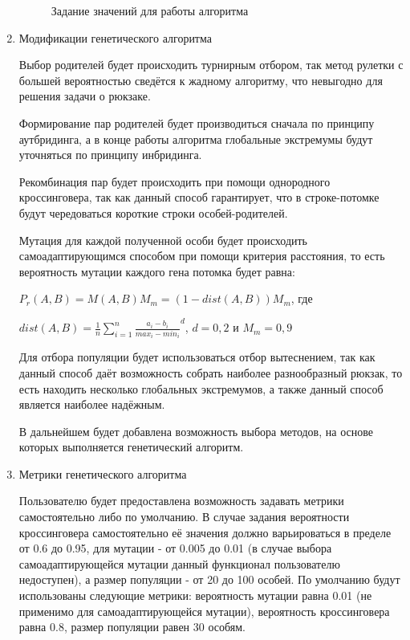 \documentclass{article}
\begin{document}
\begin{enumerate}
\begin{figure}[h!]
\begin{minipage}[h]{0.32\linewidth}
\end{minipage}
\caption{Задание значений для работы алгоритма}
\label{ris:image1}
\end{figure}

\newpage

\item Модификации генетического алгоритма

Выбор родителей будет происходить турнирным отбором, так метод рулетки с большей вероятностью сведётся к жадному алгоритму, что невыгодно для решения задачи о рюкзаке.

Формирование пар родителей будет производиться сначала по принципу аутбридинга, а в конце работы алгоритма глобальные экстремумы будут уточняться по принципу инбридинга. 

Рекомбинация пар будет происходить при помощи однородного кроссинговера, так как данный способ гарантирует, что в строке-потомке будут чередоваться короткие строки особей-родителей. 

Мутация для каждой полученной особи будет происходить самоадаптирующимся способом при помощи критерия расстояния, то есть вероятность мутации каждого гена потомка будет равна: 

{
\Large
\begin{center}
$P_r(A,B) = M(A,B)M_m = (1 - dist(A,B))M_m$, где

$dist(A,B) = \frac{1}{n}\sum_{i=1}^n\frac{a_i-b_i}{max_i-min_i}^d$, $d=0,2$ и $M_m=0,9$
\end{center}
}

Для отбора популяции будет использоваться отбор вытеснением, так как данный способ даёт возможность собрать наиболее разнообразный рюкзак, то есть находить несколько глобальных экстремумов, а также данный способ является наиболее надёжным.

В дальнейшем будет добавлена возможность выбора методов, на основе которых выполняется генетический алгоритм.

\item Метрики генетического алгоритма

Пользователю будет предоставлена возможность задавать метрики самостоятельно либо по умолчанию. В случае задания вероятности кроссинговера самостоятельно её значения должно варьироваться в пределе от 0.6 до 0.95, для мутации - от 0.005 до 0.01 (в случае выбора самоадаптирующейся мутации данный функционал пользователю недоступен), а размер популяции - от 20 до 100 особей. По умолчанию будут использованы следующие метрики: вероятность мутации равна 0.01 (не применимо для самоадаптирующейся мутации), вероятность кроссинговера равна 0.8, размер популяции равен 30 особям.


\end{enumerate}
\end{document}
